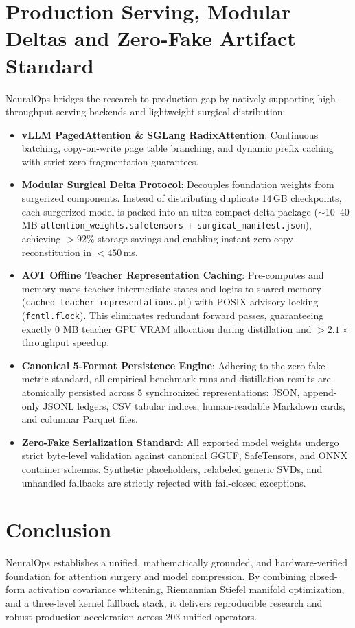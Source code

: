 \documentclass{article}
\begin{document}
\section{Production Serving, Modular Deltas and Zero-Fake Artifact Standard}
\label{sec:serving}
NeuralOps bridges the research-to-production gap by natively supporting high-throughput serving backends and lightweight surgical distribution:
\begin{itemize}
    \item \textbf{vLLM PagedAttention \& SGLang RadixAttention}: Continuous batching, copy-on-write page table branching, and dynamic prefix caching with strict zero-fragmentation guarantees.
    \item \textbf{Modular Surgical Delta Protocol}: Decouples foundation weights from surgerized components. Instead of distributing duplicate 14\,GB checkpoints, each surgerized model is packed into an ultra-compact delta package ($\sim$10--40\,MB \texttt{attention\_weights.safetensors} + \texttt{surgical\_manifest.json}), achieving $>92\%$ storage savings and enabling instant zero-copy reconstitution in $<450$\,ms.
    \item \textbf{AOT Offline Teacher Representation Caching}: Pre-computes and memory-maps teacher intermediate states and logits to shared memory (\texttt{cached\_teacher\_representations.pt}) with POSIX advisory locking (\texttt{fcntl.flock}). This eliminates redundant forward passes, guaranteeing exactly $0\text{ MB}$ teacher GPU VRAM allocation during distillation and $>2.1\times$ throughput speedup.
    \item \textbf{Canonical 5-Format Persistence Engine}: Adhering to the zero-fake metric standard, all empirical benchmark runs and distillation results are atomically persisted across 5 synchronized representations: JSON, append-only JSONL ledgers, CSV tabular indices, human-readable Markdown cards, and columnar Parquet files.
    \item \textbf{Zero-Fake Serialization Standard}: All exported model weights undergo strict byte-level validation against canonical GGUF, SafeTensors, and ONNX container schemas. Synthetic placeholders, relabeled generic SVDs, and unhandled fallbacks are strictly rejected with fail-closed exceptions.
\end{itemize}

\section{Conclusion}
\label{sec:conclusion}
NeuralOps establishes a unified, mathematically grounded, and hardware-verified foundation for attention surgery and model compression. By combining closed-form activation covariance whitening, Riemannian Stiefel manifold optimization, and a three-level kernel fallback stack, it delivers reproducible research and robust production acceleration across 203 unified operators.
\end{document}
